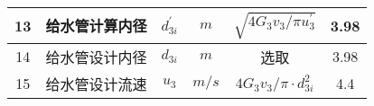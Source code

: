 \begin{table}[H]
{\begin{tabular}{|c|c|c|c|c|c|}
            13   & 给水管计算内径 & $ d_{3i}^{'} $     & $ m $      & $ \sqrt{4 G_{3} v_{3} / \pi u_{3}^{\prime}} $        & 3.98              \\ \hline
            14   & 给水管设计内径 & $ d_{3i} $         & $ m $      & 选取                                                 & 3.98              \\ \hline
            15   & 给水管设计流速 & $ u_3 $            & $ m/s $    & $ 4 G_{3} v_{3} / \pi \cdot d_{3 i}^{2} $            & 4.4               \\ \hline
        \end{tabular}
    }
\end{table}
